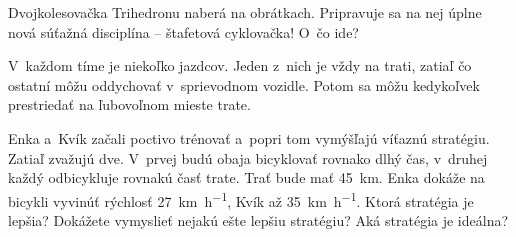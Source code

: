 Dvojkolesovačka Trihedronu naberá na obrátkach. Pripravuje sa na nej úplne nová súťažná disciplína -- štafetová cyklovačka! O~čo ide?

V~každom tíme je niekoľko jazdcov. Jeden z~nich je vždy na trati, zatiaľ čo ostatní môžu oddychovať v~sprievodnom vozidle.
Potom sa môžu kedykoľvek prestriedať na ľubovoľnom mieste trate.

Enka a~Kvík začali poctivo trénovať a~popri tom vymýšľajú víťaznú stratégiu. 
Zatiaľ zvažujú dve. V~prvej budú obaja bicyklovať rovnako dlhý čas, v~druhej každý odbicykluje rovnakú časť trate. 
Trať bude mať \SI{45}{\kilo\metre}. Enka dokáže na bicykli vyvinúť rýchlosť \SI[per-mode = symbol]{27}{\kilo\metre\per\hour},
Kvík až \SI[per-mode = symbol]{35}{\kilo\metre\per\hour}. Ktorá stratégia je lepšia? Dokážete vymyslieť nejakú ešte lepšiu stratégiu? Aká stratégia je ideálna?